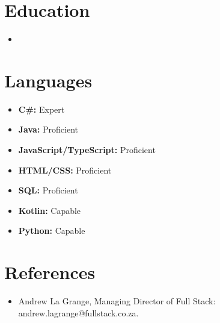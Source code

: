 \documentclass[11pt,a4paper,sans]{moderncv}
\begin{document}
\section{Education}

\vspace{4pt}

\begin{itemize}

\item{}

\end{itemize}

\vspace{2pt}

\section{Languages}

\vspace{1pt}

\begin{itemize}

\item \textbf{C\#:} Expert 

\vspace{1pt}

\item \textbf{Java:} Proficient 

\vspace{1pt}

\item \textbf{JavaScript/TypeScript:} Proficient 

\vspace{1pt}

\item \textbf{HTML/CSS:} Proficient 

\vspace{1pt}

\item \textbf{SQL:} Proficient 

\vspace{1pt}

\item \textbf{Kotlin:} Capable 

\vspace{1pt}

\item \textbf{Python:} Capable 

\end{itemize}

\section{References}

\vspace{4pt}

\begin{itemize}

\item Andrew La Grange, Managing Director of Full Stack: andrew.lagrange@fullstack.co.za.

\end{itemize}

\nocite{*}


\end{document}

